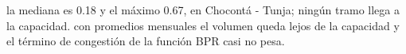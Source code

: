 {la mediana es 0.18 y el máximo 0.67, en Chocontá - Tunja; ningún tramo llega a la capacidad.}
{con promedios mensuales el volumen queda lejos de la capacidad y el término de congestión de la función BPR casi no pesa.}

